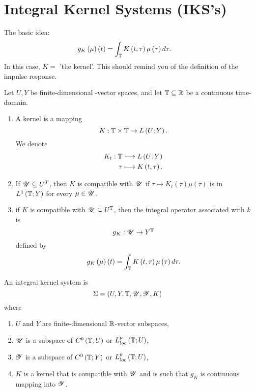 
\section{Integral Kernel Systems (IKS's)}

The basic idea:
\begin{align*}
	g_K \left( \mu \right) \left( t \right) &= \int_{\mathbb{T} }^{ } K\left( t, \tau \right) \mu\left( \tau \right) d \tau  
.\end{align*}
In this case, $K = $ 'the kernel'. This should remind you of the definition of the impulse response.

 \begin{definition}
	 Let $U, Y$ be finite-dimensional \real-vector spaces, and let $\mathbb{T}  \subseteq \mathbb{R}$ be a continuous time-domain. 
	 \begin{enumerate}
	 	\item A kernel is a mapping 
			\[
				K : \mathbb{T}  \times  \mathbb{T}  \to L\left( U; Y \right) 
			.\]
			We denote 
			\begin{align*}
				K_t: \mathbb{T}  &\longrightarrow L\left( U; Y \right)  \\
				\tau &\longmapsto K\left( t, \tau \right) 
			.\end{align*}
		\item If $\mathscr{U} \subseteq U^{T}$, then $K$ is compatible with $\mathscr{U}$ if $\tau \longmapsto K _{t}\left( \tau \right) \mu\left( \tau \right)  $ is in $L^{1}\left( \mathbb{T} ; Y \right) $ for every $\mu \in  \mathscr{U}$. 
		\item if $K$ is compatible with $\mathscr{U} \subseteq U^{\mathbb{T} }$, then the integral operator associated with $k$ is 
			\[
			g_K : \mathscr{U} \to Y^{\mathbb{T} }
			\] 
			defined by 
			\[
				g_K \left( \mu \right) \left( t \right) = \int_{\mathbb{T} }^{ } K \left( t, \tau \right) \mu\left( \tau \right) d \tau 
			.\] 
	 \end{enumerate}
\end{definition}

\begin{definition}
	An integral kernel system is 
	\[
		\Sigma = \left( U, Y, \mathbb{T} , \mathscr{U}, \mathscr{Y}, K \right) 
	\] 
	where 
	\begin{enumerate}
		\item $U$ and $Y$ are finite-dimensional $\mathbb{R}$-vector subspaces, 
		\item $\mathscr{U}$ is a subspace of $C^{0}\left( \mathbb{T} ; U \right) $ or $L^{p}_{loc}\left( \mathbb{T} ; U \right) $, 
		\item  $\mathscr{Y}$ is a subspace of $C^{0}\left( \mathbb{T} ; Y  \right) $ or $L^{p}_{loc}\left( \mathbb{T} ; U \right) $, 
		\item $K $ is a kernel that is compatible with $\mathscr{U}$ and is such that $g_K$ is continuous mapping into $\mathscr{Y}$. 
	\end{enumerate}
\end{definition}

